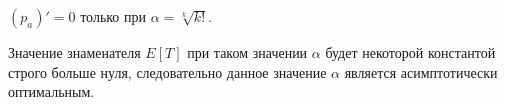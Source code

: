 \documentclass[russian]{article}
\newcommand{\OPO}{$(1 + 1)$}
\begin{document}
$(p_a)' = 0$ только при $\alpha = \sqrt[k]{k!}.$

Значение знаменателя $E[T]$ при таком значении $\alpha$ будет некоторой константой строго больше нуля, следовательно данное значение $\alpha$ является асимптотически оптимальным.

%
%
%
%
%
%

\printbibliography
\end{document}
